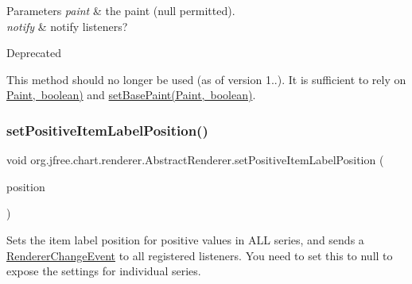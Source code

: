 \begin{DoxyParams}{Parameters}
{\em paint} & the paint ({\ttfamily null} permitted). \\
\hline
{\em notify} & notify listeners?\\
\hline
\end{DoxyParams}
\begin{DoxyRefDesc}{Deprecated}
\item[\mbox{\hyperlink{deprecated__deprecated000117}{Deprecated}}]This method should no longer be used (as of version 1..). It is sufficient to rely on \mbox{\hyperlink{}{Paint, boolean)}} and \mbox{\hyperlink{classorg_1_1jfree_1_1chart_1_1renderer_1_1_abstract_renderer_acf4a3eec1a0e25b2e6d034fc3f0aaaf7}{set\+Base\+Paint(\+Paint, boolean)}}. \end{DoxyRefDesc}
\mbox{\label{classorg_1_1jfree_1_1chart_1_1renderer_1_1_abstract_renderer_ad292484a8924e35756b3fb423fdd4ccc}} 
\subsubsection{\texorpdfstring{set\+Positive\+Item\+Label\+Position()}{setPositiveItemLabelPosition()}\hspace{0.1cm}{\footnotesize\ttfamily [1/2]}}
{\footnotesize\ttfamily void org.\+jfree.\+chart.\+renderer.\+Abstract\+Renderer.\+set\+Positive\+Item\+Label\+Position (\begin{DoxyParamCaption}\item[{\mbox{\hyperlink{classorg_1_1jfree_1_1chart_1_1labels_1_1_item_label_position}{Item\+Label\+Position}}}]{position }\end{DoxyParamCaption})}

Sets the item label position for positive values in A\+LL series, and sends a \mbox{\hyperlink{}{Renderer\+Change\+Event}} to all registered listeners. You need to set this to {\ttfamily null} to expose the settings for individual series.


